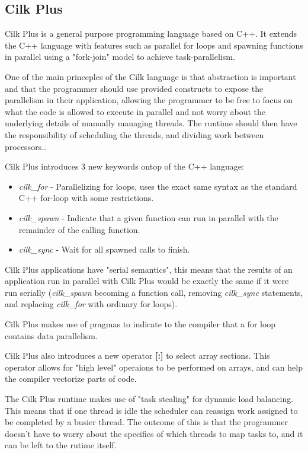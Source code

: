 \subsection{Cilk Plus}

Cilk Plus is a general purpose programming language based on C++. It extends the C++ language with features such as
parallel for loops and spawning functions in parallel using a "fork-join" model to achieve task-parallelism.

One of the main princeples of the Cilk language is that abstraction is important and that the programmer should use provided constructs to expose 
the parallelism in their application, allowing the programmer to be free to focus on what the code is allowed to execute in parallel and not worry about the underlying details of manually managing threads. The runtime should then have the responsibility of scheduling the threads, and dividing work between
processors.\cite{cilkfaq}. 

Cilk Plus introduces 3 new keywords ontop of the C++ language\cite{cilk}: 
\begin{itemize}
    \item \textit{cilk\_for} - Parallelizing for loops, uses the exact same syntax as the standard C++ for-loop
                             with some restrictions.
    \item \textit{cilk\_spawn} - Indicate that a given function can run in parallel with the remainder
                              of the calling function. 
    \item \textit{cilk\_sync} - Wait for all spawned calls to finish.
\end{itemize}

Cilk Plus applications have "serial semantics"\cite{cilk}, this means that the results of an application run
in parallel with Cilk Plus would be exactly the same if it were run
serially (\textit{cilk\_spawn} becoming a function call, removing \textit{cilk\_sync} statements, 
and replacing \textit{cilk\_for} with ordinary for loops).

Cilk Plus makes use of pragmas to indicate to the compiler that a for loop contains data parallelism.\cite{cilkfaq}

Cilk Plus also introduces a new operator \textbf{[:]} to select array sections\cite{cilkarray}. This operator
allows for "high level" operaions to be performed on arrays, and can help the compiler vectorize parts of code.

The Cilk Plus runtime makes use of "task stealing" for dynamic load balancing\cite{cilkfaq}. This 
means that if one thread is idle the scheduler can reassign work assigned to be completed by a busier thread. 
The outcome of this is that the programmer doesn't have to worry about the specifics of which threads
to map tasks to, and it can be left to the rutime itself.


